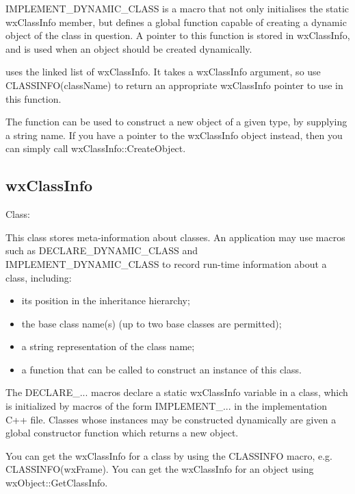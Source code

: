 IMPLEMENT\_DYNAMIC\_CLASS is a macro that not only initialises the static
wxClassInfo member, but defines a global function capable of creating a
dynamic object of the class in question. A pointer to this function is
stored in wxClassInfo, and is used when an object should be created
dynamically.

 uses the linked list of
wxClassInfo. It takes a wxClassInfo argument, so use CLASSINFO(className)
to return an appropriate wxClassInfo pointer to use in this function.

The function  can be used
to construct a new object of a given type, by supplying a string name.
If you have a pointer to the wxClassInfo object instead, then you
can simply call wxClassInfo::CreateObject.

\subsection{wxClassInfo}\label{wxclassinfooverview}


Class: 

This class stores meta-information about classes. An application
may use macros such as DECLARE\_DYNAMIC\_CLASS and IMPLEMENT\_DYNAMIC\_CLASS
to record run-time information about a class, including:

\begin{itemize}\itemsep=0pt
\item its position in the inheritance hierarchy;
\item the base class name(s) (up to two base classes are permitted);
\item a string representation of the class name;
\item a function that can be called to construct an instance of this class.
\end{itemize}

The DECLARE\_... macros declare a static wxClassInfo variable in a class, which is initialized
by macros of the form IMPLEMENT\_... in the implementation C++ file. Classes whose instances may be
constructed dynamically are given a global constructor function which returns a new object.

You can get the wxClassInfo for a class by using the CLASSINFO macro, e.g. CLASSINFO(wxFrame).
You can get the wxClassInfo for an object using wxObject::GetClassInfo.

